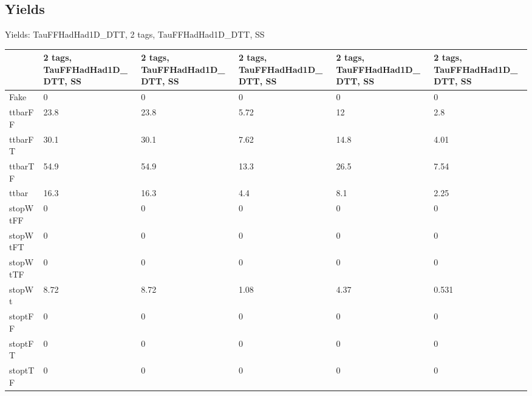 
\subsection{Yields}

\begin{frame}{Yields: TauFFHadHad1D\_DTT, 2 tags, TauFFHadHad1D\_DTT, SS}
\begin{center}
  \begin{tabular}{l| >{\centering\let\newline\\\arraybackslash\hspace{0pt}}m{1.4cm}| >{\centering\let\newline\\\arraybackslash\hspace{0pt}}m{1.4cm}| >{\centering\let\newline\\\arraybackslash\hspace{0pt}}m{1.4cm}| >{\centering\let\newline\\\arraybackslash\hspace{0pt}}m{1.4cm}| >{\centering\let\newline\\\arraybackslash\hspace{0pt}}m{1.4cm}}
    & 2 tags, TauFFHadHad1D\_DTT, SS & 2 tags, TauFFHadHad1D\_DTT, SS & 2 tags, TauFFHadHad1D\_DTT, SS & 2 tags, TauFFHadHad1D\_DTT, SS & 2 tags, TauFFHadHad1D\_DTT, SS \\
 \hline \hline
    Fake& 0 & 0 & 0 & 0 & 0 \\
 \hline
    ttbarFF& 23.8 & 23.8 & 5.72 & 12 & 2.8 \\
 \hline
    ttbarFT& 30.1 & 30.1 & 7.62 & 14.8 & 4.01 \\
 \hline
    ttbarTF& 54.9 & 54.9 & 13.3 & 26.5 & 7.54 \\
 \hline
    ttbar& 16.3 & 16.3 & 4.4 & 8.1 & 2.25 \\
 \hline
    stopWtFF& 0 & 0 & 0 & 0 & 0 \\
 \hline
    stopWtFT& 0 & 0 & 0 & 0 & 0 \\
 \hline
    stopWtTF& 0 & 0 & 0 & 0 & 0 \\
 \hline
    stopWt& 8.72 & 8.72 & 1.08 & 4.37 & 0.531 \\
 \hline
    stoptFF& 0 & 0 & 0 & 0 & 0 \\
 \hline
    stoptFT& 0 & 0 & 0 & 0 & 0 \\
 \hline
    stoptTF& 0 & 0 & 0 & 0 & 0 \\

\end{tabular}
\end{center}
\end{frame}
